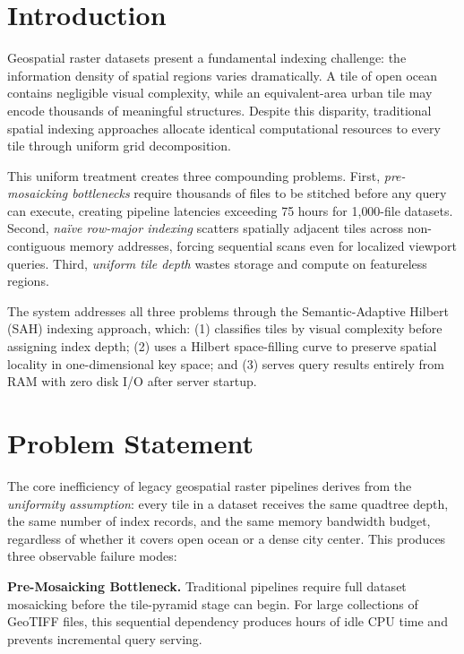 \documentclass[conference]{IEEEtran}
\begin{document}
\section{Introduction}

Geospatial raster datasets present a fundamental indexing challenge: the information density of spatial regions varies dramatically. A tile of open ocean contains negligible visual complexity, while an equivalent-area urban tile may encode thousands of meaningful structures. Despite this disparity, traditional spatial indexing approaches allocate identical computational resources to every tile through uniform grid decomposition.

This uniform treatment creates three compounding problems. First,
\textit{pre-mosaicking bottlenecks} require thousands of files to be stitched
before any query can execute, creating pipeline latencies exceeding 75 hours for 1{,}000-file datasets. Second, \textit{naïve row-major indexing} scatters spatially adjacent tiles across non-contiguous memory addresses, forcing sequential scans even for localized viewport queries. Third,
\textit{uniform tile depth} wastes storage and compute on featureless regions.

The system addresses all three problems through the Semantic-Adaptive Hilbert (SAH) indexing approach, which: (1) classifies tiles by visual complexity before assigning index depth; (2) uses a Hilbert space-filling curve to preserve spatial locality in one-dimensional key space; and (3) serves query results entirely from RAM with zero disk I/O after server startup.

\section{Problem Statement}

The core inefficiency of legacy geospatial raster pipelines derives from the
\textit{uniformity assumption}: every tile in a dataset receives the same
quadtree depth, the same number of index records, and the same memory bandwidth budget, regardless of whether it covers open ocean or a dense city center. This produces three observable failure modes:

\textbf{Pre-Mosaicking Bottleneck.} Traditional pipelines require full dataset
mosaicking before the tile-pyramid stage can begin. For large collections of GeoTIFF files, this sequential dependency produces hours of idle CPU time and prevents incremental query serving.
\end{document}
